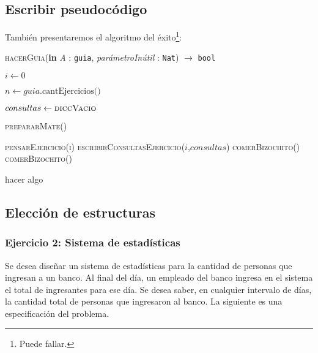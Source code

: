 \documentclass[10pt, a4paper]{article}
\newcommand{\bigO}{\mathcal{O}}
\begin{document}
\subsection{Escribir pseudoc\'odigo}
Tambi\'en presentaremos el algoritmo del \'exito\footnote{Puede fallar. }:

\newcommand{\asignar}[2]{$#1 \gets #2$}

\begin{algorithm}[H]
    \caption{\textsc{hacerGuia}(\textbf{in} \textit{A} : \texttt{guia}, \textit{parámetroInútil} : \texttt{Nat}) $\longrightarrow$ \texttt{bool}}
    \begin{algorithmic}[1]
      \State \asignar{i}{0} 

      \State \asignar{n}{guia.\text{cantEjercicios()}} \Comment{$\bigO$(1)}

     \State \asignar{consultas}{\textsc{diccVacio}} 

      \State \textsc{prepararMate()} 

      \State \textsc{pensarEjercicio(i)} 
        \State \textsc{escribirConsultasEjercicio($i$,$consultas$)} 
      \Else
        \State \textsc{comerBizochito()}
      \EndIf
        \State \textsc{comerBizochito()}
      \EndWhile
      
           \State hacer algo
      \EndFor

      \State {} 
    \end{algorithmic}
  \end{algorithm}


\subsection{Elección de estructuras}

\subsubsection*{Ejercicio 2: Sistema de estadísticas}

Se desea diseñar un sistema de estadísticas para la cantidad de personas
que ingresan a un banco. Al final del día, un empleado del banco ingresa en
el sistema el total de ingresantes para ese día. Se desea saber, en cualquier
intervalo de días, la cantidad total de personas que ingresaron al banco.
La siguiente es una especificación del problema.
\end{document}
